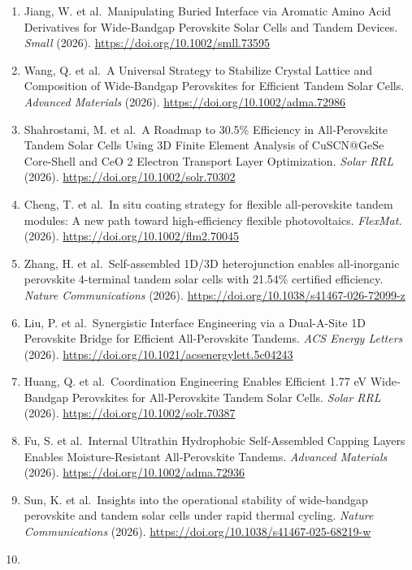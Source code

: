\documentclass[
  11pt,
]{article}
\begin{document}
\begin{enumerate}
  Sn--Pb Perovskite and All‐Perovskite Tandem Solar Cells.
  \emph{Advanced Energy Materials} (2026).
  \url{https://doi.org/10.1002/aenm.70910}
\item
  Jiang, W. et al.~Manipulating Buried Interface via Aromatic Amino Acid
  Derivatives for Wide‐Bandgap Perovskite Solar Cells and Tandem
  Devices. \emph{Small} (2026). \url{https://doi.org/10.1002/smll.73595}
\item
  Wang, Q. et al.~A Universal Strategy to Stabilize Crystal Lattice and
  Composition of Wide‐Bandgap Perovskites for Efficient Tandem Solar
  Cells. \emph{Advanced Materials} (2026).
  \url{https://doi.org/10.1002/adma.72986}
\item
  Shahrostami, M. et al.~A Roadmap to 30.5\% Efficiency in
  All‐Perovskite Tandem Solar Cells Using 3D Finite Element Analysis of
  CuSCN@GeSe Core‐Shell and CeO 2 Electron Transport Layer Optimization.
  \emph{Solar RRL} (2026). \url{https://doi.org/10.1002/solr.70302}
\item
  Cheng, T. et al.~In situ coating strategy for flexible all‐perovskite
  tandem modules: A new path toward high‐efficiency flexible
  photovoltaics. \emph{FlexMat.} (2026).
  \url{https://doi.org/10.1002/flm2.70045}
\item
  Zhang, H. et al.~Self-assembled 1D/3D heterojunction enables
  all-inorganic perovskite 4-terminal tandem solar cells with 21.54\%
  certified efficiency. \emph{Nature Communications} (2026).
  \url{https://doi.org/10.1038/s41467-026-72099-z}
\item
  Liu, P. et al.~Synergistic Interface Engineering via a Dual-A-Site 1D
  Perovskite Bridge for Efficient All-Perovskite Tandems. \emph{ACS
  Energy Letters} (2026).
  \url{https://doi.org/10.1021/acsenergylett.5c04243}
\item
  Huang, Q. et al.~Coordination Engineering Enables Efficient 1.77 eV
  Wide‐Bandgap Perovskites for All‐Perovskite Tandem Solar Cells.
  \emph{Solar RRL} (2026). \url{https://doi.org/10.1002/solr.70387}
\item
  Fu, S. et al.~Internal Ultrathin Hydrophobic Self‐Assembled Capping
  Layers Enables Moisture‐Resistant All‐Perovskite Tandems.
  \emph{Advanced Materials} (2026).
  \url{https://doi.org/10.1002/adma.72936}
\item
  Sun, K. et al.~Insights into the operational stability of wide-bandgap
  perovskite and tandem solar cells under rapid thermal cycling.
  \emph{Nature Communications} (2026).
  \url{https://doi.org/10.1038/s41467-025-68219-w}
\item

\end{enumerate}
\end{document}
